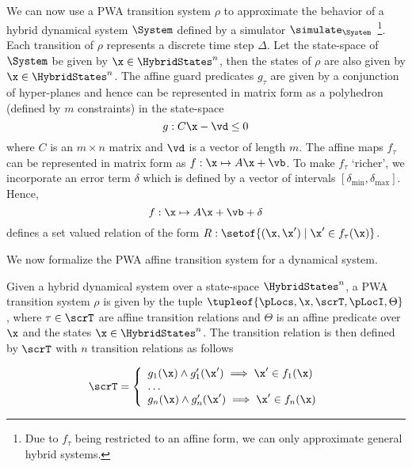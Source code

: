 We can now use a PWA transition system $\rho$ to approximate the
behavior of a hybrid dynamical system $\System$ defined by a simulator
$\simulate_{\System}$~\footnote{Due to $f_\tau$ being restricted to an affine
form, we can only approximate general hybrid systems.}. Each
transition of $\rho$ represents a discrete time step $\Delta$. Let the
state-space of $\System$ be given by $\x\in\HybridStates^n$, then the
states of $\rho$ are also given by $\x\in\HybridStates^n$. The affine guard
predicates $g_\tau$ are given by a conjunction of hyper-planes and
hence can be represented in matrix form as a polyhedron (defined by
$m$ constraints) in the state-space
\[
g:C\x - \vd \le 0
\]
where $C$ is an $m \times n$ matrix and $\vd$ is a vector of length
$m$. The affine maps $f_\tau$ can be represented in matrix form as
$f:\x \mapsto A\x+\vb$. To make $f_\tau$ `richer', we incorporate
an error term $\delta$ which is defined by a vector of intervals
$[\delta_{\min},\delta_{\max}]$. Hence,
\[
f:\x \mapsto A\x + \vb + \delta
\]
defines a set valued relation of the form $R:\setof{(\x,\x') \;|\; \x'
\in f_\tau(\x)}$.



We now formalize the PWA affine transition system for a dynamical system.
\begin{definition}

Given a hybrid dynamical system over a state-space
$\HybridStates^n$, a PWA transition system $\rho$ is given by the
tuple $\tupleof{\pLocs,\x,\scrT,\pLocI,\Theta}$, where $\tau \in
\scrT$ are affine transition relations and $\Theta$ is an affine
predicate over $\x$ and the states $\x\in\HybridStates^n$. The
transition relation is then defined by $\scrT$ with $n$ transition
relations as follows

\begin{equation}
    \scrT = \left\{
        \begin{array}{ll}
            g_1(\x) \land g'_1(\x') \implies \x' \in f_1(\x) \\
            \ldots\\
            g_n(\x) \land g'_n(\x') \implies \x' \in f_n(\x) \\
        \end{array}
    \right.
\end{equation}

\end{definition}

